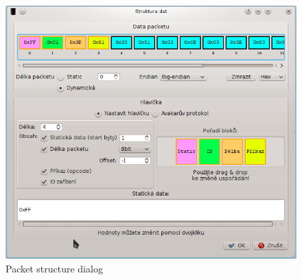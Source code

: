 \documentclass[12pt, a4paper, oneside]{article}
\begin{document}
\begin{figure}[H]
\begin{center}
\includegraphics[scale=0.65]{img/analyzer_struct.png}
\caption{Packet structure dialog}
\label{Analyzer_struct}
\end{center}
\end{figure}
\end{document}
